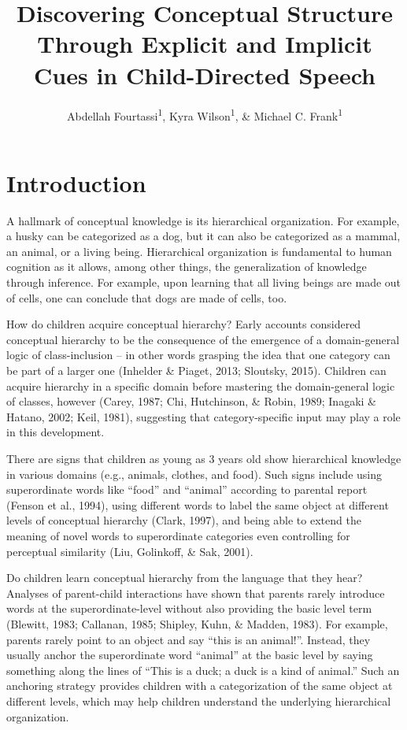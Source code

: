 \documentclass[english,,man,floatsintext]{apa6}
\title{Discovering Conceptual Structure Through Explicit and Implicit Cues in Child-Directed Speech}
\author{Abdellah Fourtassi\textsuperscript{1}, Kyra Wilson\textsuperscript{1}, \& Michael C. Frank\textsuperscript{1}}
\date{}
\affiliation{\vspace{0.5cm}\textsuperscript{1} Department of Psychology, Stanford University}
\begin{document}
\maketitle

\hypertarget{introduction}{%
\section{Introduction}\label{introduction}}

A hallmark of conceptual knowledge is its hierarchical organization. For example, a husky can be categorized as a dog, but it can also be categorized as a mammal, an animal, or a living being. Hierarchical organization is fundamental to human cognition as it allows, among other things, the generalization of knowledge through inference. For example,
upon learning that all living beings are made out of cells, one can conclude that dogs are made of cells, too.

How do children acquire conceptual hierarchy? Early accounts considered
conceptual hierarchy to be the consequence of the emergence of a
domain-general logic of class-inclusion -- in other words grasping the idea that one category can be part of a larger one
(Inhelder \& Piaget, 2013; Sloutsky, 2015). Children can acquire hierarchy in a specific domain before mastering the domain-general logic of classes, however (Carey, 1987; Chi, Hutchinson, \& Robin, 1989; Inagaki \& Hatano, 2002; Keil, 1981), suggesting that category-specific input may play a role in this development.

There are signs that children as young as 3 years old show hierarchical knowledge in various domains (e.g., animals, clothes, and food). Such
signs include using superordinate words like \enquote{food} and \enquote{animal} according to parental report (Fenson et al., 1994), using different
words to label the same object at different levels of conceptual hierarchy (Clark, 1997), and being able to extend the meaning of novel words to superordinate categories even controlling for perceptual similarity (Liu, Golinkoff, \& Sak, 2001).

Do children learn conceptual hierarchy from the language that they hear? Analyses of parent-child interactions have shown that parents rarely introduce words at the
superordinate-level without also providing the basic level term (Blewitt, 1983; Callanan, 1985; Shipley, Kuhn, \& Madden, 1983). For example, parents rarely point to an object and say \enquote{this is an animal!}. Instead, they usually anchor the superordinate word \enquote{animal} at the basic level by saying something along the lines of \enquote{This is a duck; a duck is a kind of animal.} Such an anchoring strategy provides children with a categorization of the same object at different levels, which may help children understand the underlying hierarchical organization.
\end{document}
